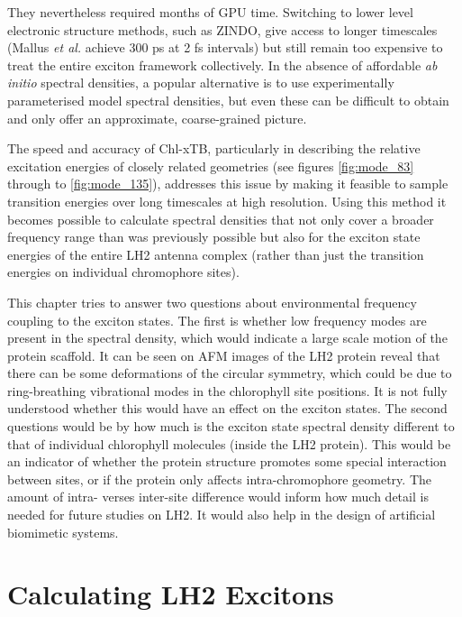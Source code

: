 They nevertheless required months of GPU time. Switching to lower level electronic
structure methods, such as ZINDO, give access to longer timescales (Mallus \emph{et al.}
achieve 300 ps at 2 fs intervals\cite{Mallus2018}) but still remain too expensive 
to treat the entire exciton framework collectively. In the absence of affordable 
\emph{ab initio} spectral densities, a popular alternative is to use experimentally 
parameterised model spectral densities\cite{Ishizaki2009,Renger2002,Padula2017}, 
but even these can be difficult to obtain and only offer an approximate, coarse-grained 
picture. 

The speed and accuracy of Chl-xTB, particularly in describing the relative excitation 
energies of closely related geometries (see figures \ref{fig:mode_83} through to \ref{fig:mode_135}), 
addresses this issue by making it feasible to sample transition energies over long
timescales at high resolution. Using this method it becomes possible to calculate 
spectral densities that not only cover a broader frequency range than was previously
possible but also for the exciton state energies of the entire LH2 antenna complex 
(rather than just the transition energies on individual chromophore sites).

This chapter tries to answer two questions about environmental frequency coupling
to the exciton states. The first is whether low frequency modes are present in the
spectral density, which would indicate a large scale motion of the protein scaffold.
It can be seen on AFM images of the LH2 protein reveal that there can be some deformations
of the circular symmetry, which could be due to ring-breathing vibrational modes 
in the chlorophyll site positions. It is not fully understood whether this would
have an effect on the exciton states. The second questions would be by how much 
is the exciton state spectral density different to that of individual chlorophyll 
molecules (inside the LH2 protein). This would be an indicator of whether the protein
structure promotes some special interaction between sites, or if the protein only
affects intra-chromophore geometry. The amount of intra- verses inter-site difference
would inform how much detail is needed for future studies on LH2. It would also 
help in the design of artificial biomimetic systems.

\section{Calculating LH2 Excitons}
\label{sec:MD}

